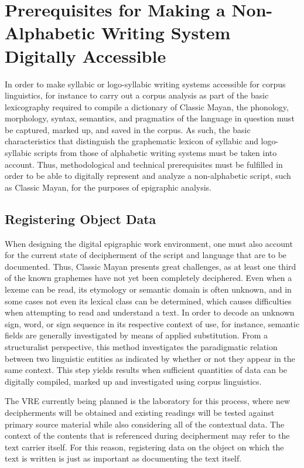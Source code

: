 \documentclass[amsthm,ebook]{saparticle}
\begin{document}
\section[Prerequisites for Making a Non{}-Alphabetic Writing System Digitally Accessible]{Prerequisites for
Making a Non-Alphabetic Writing System Digitally Accessible}
\noindent In order to make syllabic or logo-syllabic writing systems accessible for corpus linguistics, for instance to carry out
a corpus analysis as part of the basic lexicography required to compile a dictionary of Classic Mayan, the phonology,
morphology, syntax, semantics, and pragmatics of the language in question must be captured, marked up, and saved in the
corpus. As such, the basic characteristics that distinguish the graphematic lexicon of syllabic and logo-syllabic
scripts from those of alphabetic writing systems must be taken into account. Thus, methodological and technical
prerequisites must be fulfilled in order to be able to digitally represent and analyze a non-alphabetic script, such as
Classic Mayan, for the purposes of epigraphic analysis.

\subsection[Registering Object Data ]{Registering Object Data}
\noindent When designing the digital epigraphic work environment, one must also account for the current state of decipherment of
the script and language that are to be documented. Thus, Classic Mayan presents great challenges, as at least one third
of the known graphemes have not yet been completely deciphered. Even when a lexeme can be read, its etymology or
semantic domain is often unknown, and in some cases not even its lexical class can be determined, which causes
difficulties when attempting to read and understand a text. In order to decode an unknown sign, word, or sign sequence
in its respective context of use, for instance, semantic fields are generally investigated by means of applied
substitution. From a structuralist perspective, this method investigates the paradigmatic relation between two
linguistic entities as indicated by whether or not they appear in the same context. 
This step yields
results when sufficient quantities of data can be digitally compiled, marked up and investigated using corpus
linguistics. 

The VRE currently being planned is the laboratory for this process, where new decipherments will be obtained and
existing readings will be tested against primary source material while also considering all of the contextual data. The
context of the contents that is referenced during decipherment may refer to the text carrier itself. For this reason,
registering data on the object on which the text is written is just as important as documenting the text itself. 
\end{document}
